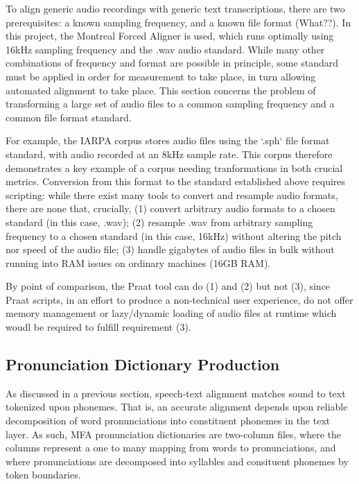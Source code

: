 \documentclass[11pt]{article}
\begin{document}
To align generic audio recordings with generic text transcriptions, there are two prerequisites: a known sampling frequency, and a known file format (What??). In this project, the Montreal Forced Aligner is used, which runs optimally using 16kHz sampling frequency and the .wav audio standard. While many other combinations of frequency and format are possible in principle, some standard must be applied in order for measurement to take place, in turn allowing automated alignment to take place. This section concerns the problem of transforming a large set of audio files to a common sampling frequency and a common file format standard.

For example, the IARPA corpus stores audio files using the `.sph` file format standard, with audio recorded at an 8kHz sample rate. This corpus therefore demonstrates a key example of a corpus needing tranformations in both crucial metrics. Conversion from this format to the standard established above requires scripting: while there exist many tools to convert and resample audio formats, there are none that, crucially, (1) convert arbitrary audio formats to a chosen standard (in this case, .wav); (2) resample .wav from arbitrary sampling frequency to a chosen standard (in this case, 16kHz) without altering the pitch nor speed of the audio file; (3) handle gigabytes of audio files in bulk without running into RAM issues on ordinary machines (16GB RAM).

By point of comparison, the Praat tool can do (1) and (2) but not (3), since Praat scripts, in an effort to produce a non-technical user experience, do not offer memory management or lazy/dynamic loading of audio files at runtime which woudl be required to fulfill requirement (3).



\subsection{Pronunciation Dictionary Production}

As discussed in a previous section, speech-text alignment matches sound to text tokenized upon phonemes. That is, an accurate alignment depends upon reliable decomposition of word pronunciations into constituent phonemes in the text layer. As such, MFA pronunciation dictionaries are two-column files, where the columns represent a one to many mapping from words to pronunciations, and where pronunciations are decomposed into syllables and consituent phonemes by token boundaries.
\end{document}
